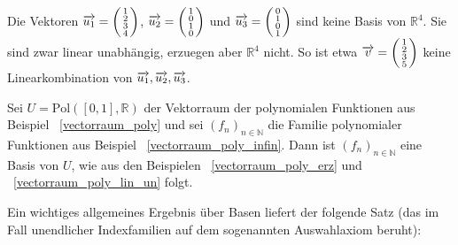 \begin{beispiel} Die Vektoren  $\overrightarrow{u_1} = 
\left( \begin{smallmatrix} 1 \\ 2 \\ 3 \\ 4
\end{smallmatrix} \right)$, $\overrightarrow{u_2} = \left( \begin{smallmatrix} 1 \\ 0 \\ 1 \\ 0 
\end{smallmatrix} \right)$ und $\overrightarrow{u_3} = \left( \begin{smallmatrix} 0 \\ 1 \\ 0 \\ 1 
\end{smallmatrix} \right)$ sind keine Basis von $\mathbb R^4$. Sie sind zwar linear unabhängig, erzuegen aber 
$\mathbb R^4$ nicht. So ist etwa $\overrightarrow{v} = 
\left( \begin{smallmatrix} 1 \\ 2 \\ 3 \\ 5 \end{smallmatrix} \right)$ keine Linearkombination von 
$\overrightarrow{u_1}, \overrightarrow{u_2}, \overrightarrow{u_3}$. 
\end{beispiel}

\begin{beispiel}\label{vectorraum_poly_basis} Sei $U = \textrm{Pol}([0,1], \mathbb R)$ der Vektorraum der 
polynomialen Funktionen aus Beispiel ~\ref{vectorraum_poly} und sei $\left( f_{n} \right)_{n \in \mathbb N}$
die Familie polynomialer Funktionen aus Beispiel ~\ref{vectorraum_poly_infin}. Dann ist 
$\left( f_{n} \right)_{n \in \mathbb N}$ eine Basis von $U$, wie aus den Beispielen ~\ref{vectorraum_poly_erz} 
und ~\ref{vectorraum_poly_lin_un} folgt.
\end{beispiel}

\bigbreak

Ein wichtiges allgemeines Ergebnis über Basen liefert der folgende Satz (das im Fall unendlicher Indexfamilien 
auf dem sogenannten Auswahlaxiom beruht):

